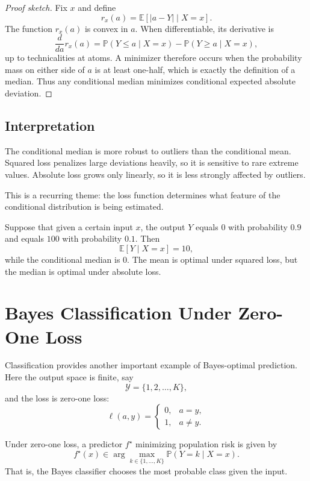 \begin{proof}[Proof sketch]
Fix $x$ and define
\[
r_x(a)=\mathbb{E}[|a-Y|\mid X=x].
\]
The function $r_x(a)$ is convex in $a$. When differentiable, its derivative is
\[
\frac{d}{da} r_x(a)
= \mathbb{P}(Y\le a\mid X=x) - \mathbb{P}(Y\ge a\mid X=x),
\]
up to technicalities at atoms. A minimizer therefore occurs when the probability mass on either side of $a$ is at least one-half, which is exactly the definition of a median. Thus any conditional median minimizes conditional expected absolute deviation.
\end{proof}

\subsection{Interpretation}

The conditional median is more robust to outliers than the conditional mean. Squared loss penalizes large deviations heavily, so it is sensitive to rare extreme values. Absolute loss grows only linearly, so it is less strongly affected by outliers.

This is a recurring theme: the loss function determines what feature of the conditional distribution is being estimated.

\begin{example}
Suppose that given a certain input $x$, the output $Y$ equals $0$ with probability $0.9$ and equals $100$ with probability $0.1$. Then
\[
\mathbb{E}[Y\mid X=x] = 10,
\]
while the conditional median is $0$. The mean is optimal under squared loss, but the median is optimal under absolute loss.
\end{example}

\section{Bayes Classification Under Zero-One Loss}

Classification provides another important example of Bayes-optimal prediction. Here the output space is finite, say
\[
\mathcal{Y} = \{1,2,\dots,K\},
\]
and the loss is zero-one loss:
\[
\ell(a,y)=
\begin{cases}
0, & a=y,\\
1, & a\neq y.
\end{cases}
\]

\begin{theorem}
Under zero-one loss, a predictor $f^\star$ minimizing population risk is given by
\[
f^\star(x)\in \arg\max_{k\in\{1,\dots,K\}} \mathbb{P}(Y=k\mid X=x).
\]
That is, the Bayes classifier chooses the most probable class given the input.
\end{theorem}

